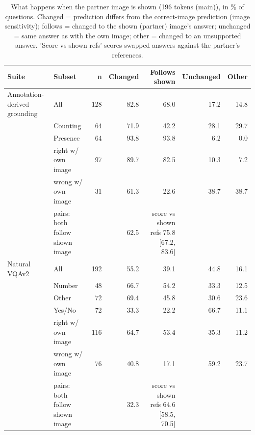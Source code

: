 \begin{table}[t]
\centering
\small
\caption{What happens when the partner image is shown (196 tokens (main)), in \% of questions. Changed = prediction differs from the correct-image prediction (image sensitivity); follows = changed to the shown (partner) image's answer; unchanged = same answer as with the own image; other = changed to an unsupported answer. 'Score vs shown refs' scores swapped answers against the partner's references.}
\label{tab:t2_t4_swap_decomposition_main}
\begin{tabular}{llrrrrr}
\toprule
Suite & Subset & n & Changed & Follows shown & Unchanged & Other \\
\midrule
Annotation-derived grounding & All & 128 & 82.8 & 68.0 & 17.2 & 14.8 \\
 & Counting & 64 & 71.9 & 42.2 & 28.1 & 29.7 \\
 & Presence & 64 & 93.8 & 93.8 & 6.2 & 0.0 \\
 & right w/ own image & 97 & 89.7 & 82.5 & 10.3 & 7.2 \\
 & wrong w/ own image & 31 & 61.3 & 22.6 & 38.7 & 38.7 \\
 & pairs: both follow shown image &  & 62.5 & score vs shown refs 75.8 [67.2, 83.6] &  &  \\
Natural VQAv2 & All & 192 & 55.2 & 39.1 & 44.8 & 16.1 \\
 & Number & 48 & 66.7 & 54.2 & 33.3 & 12.5 \\
 & Other & 72 & 69.4 & 45.8 & 30.6 & 23.6 \\
 & Yes/No & 72 & 33.3 & 22.2 & 66.7 & 11.1 \\
 & right w/ own image & 116 & 64.7 & 53.4 & 35.3 & 11.2 \\
 & wrong w/ own image & 76 & 40.8 & 17.1 & 59.2 & 23.7 \\
 & pairs: both follow shown image &  & 32.3 & score vs shown refs 64.6 [58.5, 70.5] &  &  \\
\bottomrule
\end{tabular}
\end{table}
